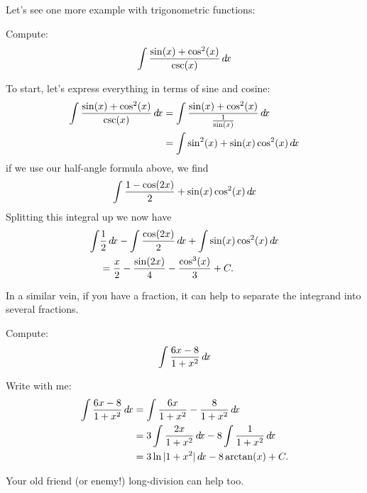 \documentclass{ximera}
\begin{document}
Let's see one more example with trigonometric functions:

\begin{example}
  Compute:
  \[
  \int \frac{\sin(x) + \cos^2(x)}{\csc(x)} \mathop{}\!d\! x
  \]
  \begin{explanation}
    To start, let's express everything in terms of sine and cosine:
    \begin{align*}
      \int \frac{\sin(x) + \cos^2(x)}{\csc(x)} \mathop{}\!d\! x &= \int \frac{\sin(x) + \cos^2(x)}{\frac{1}{\sin(x)}} \mathop{}\!d\! x\\
      &= \int \sin^2(x) + \sin(x)\cos^2(x) \mathop{}\!d\! x
    \end{align*}
    if we use our half-angle formula above, we find
    \[
    \int \frac{1-\cos(2x)}{2}+ \sin(x)\cos^2(x) \mathop{}\!d\! x
    \]
    Splitting this integral up we now have
    \begin{align*}
      \int &\frac{1}{2} \mathop{}\!d\! x - \int \frac{\cos(2x)}{2}\mathop{}\!d\! x + \int \sin(x)\cos^2(x) \mathop{}\!d\! x  \\
      &= \frac{x}{2} - \frac{\sin(2x)}{4} - \frac{\cos^3(x)}{3}+C.
    \end{align*}
  \end{explanation}
\end{example}

In a similar vein, if you have a fraction, it can help to separate the
integrand into several fractions.

\begin{example}
  Compute:
  \[
  \int \frac{6x-8}{1+x^2}\mathop{}\!d\! x
  \]
  \begin{explanation}
    Write with me:
    \begin{align*}
      \int \frac{6x-8}{1+x^2}\d x &= \int \frac{6x}{1+x^2}-\frac{8}{1+x^2}\d x\\
      &= 3\int\frac{2x}{1+x^2}\d x -8\int \frac{1}{1+x^2}\d x\\
      &= 3\ln|1+x^2|\d x -8\arctan(x)+ C.\\
    \end{align*}
  \end{explanation}
\end{example}

Your old friend (or enemy!) long-division can help too.
\end{document}
